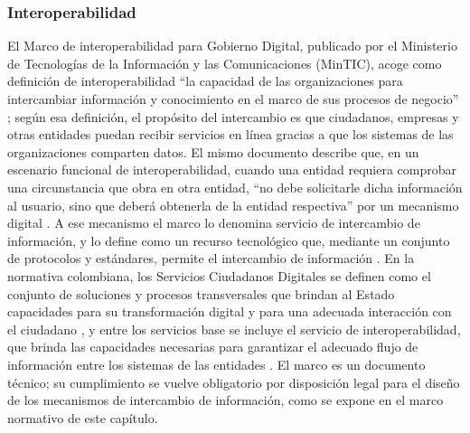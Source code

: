 \subsubsection{Interoperabilidad}

El Marco de interoperabilidad para Gobierno Digital, publicado por el Ministerio de Tecnologías de la Información y las Comunicaciones (MinTIC), acoge como definición de interoperabilidad \enquote{la capacidad de las organizaciones para intercambiar información y conocimiento en el marco de sus procesos de negocio} \parencite[p.~33]{mintic2019marco}; según esa definición, el propósito del intercambio es que ciudadanos, empresas y otras entidades puedan recibir servicios en línea gracias a que los sistemas de las organizaciones comparten datos. El mismo documento describe que, en un escenario funcional de interoperabilidad, cuando una entidad requiera comprobar una circunstancia que obra en otra entidad, \enquote{no debe solicitarle dicha información al usuario, sino que deberá obtenerla de la entidad respectiva} por un mecanismo digital \parencite[p.~19]{mintic2019marco}. A ese mecanismo el marco lo denomina servicio de intercambio de información, y lo define como un recurso tecnológico que, mediante un conjunto de protocolos y estándares, permite el intercambio de información \parencite[p.~10]{mintic2019marco}. En la normativa colombiana, los Servicios Ciudadanos Digitales se definen como el conjunto de soluciones y procesos transversales que brindan al Estado capacidades para su transformación digital y para una adecuada interacción con el ciudadano \parencite[art.~2.2.17.1.4, num.~13]{colombia2020decreto620}, y entre los servicios base se incluye el servicio de interoperabilidad, que brinda las capacidades necesarias para garantizar el adecuado flujo de información entre los sistemas de las entidades \parencite[art.~2.2.17.2.1.1, num.~1.1]{colombia2020decreto620}. El marco es un documento técnico; su cumplimiento se vuelve obligatorio por disposición legal para el diseño de los mecanismos de intercambio de información, como se expone en el marco normativo de este capítulo.

